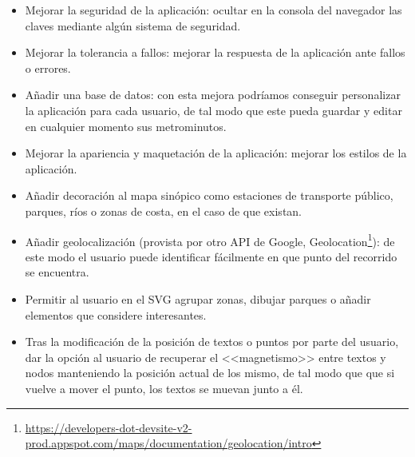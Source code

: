 \begin{itemize}
	\item Mejorar la seguridad de la aplicación: ocultar en la consola del navegador las claves mediante algún sistema de seguridad.
	\item Mejorar la tolerancia a fallos: mejorar la respuesta de la aplicación ante fallos o errores.
	\item Añadir una base de datos: con esta mejora podríamos conseguir personalizar la aplicación para cada usuario, de tal modo que este pueda guardar y editar en cualquier momento sus metrominutos.
	\item Mejorar la apariencia y maquetación de la aplicación: mejorar los estilos de la aplicación.
	\item Añadir decoración al mapa sinópico como estaciones de transporte público, parques, ríos o zonas de costa, en el caso de que existan.
	\item Añadir geolocalización (provista por otro API de Google, Geolocation\footnote{\url{https://developers-dot-devsite-v2-prod.appspot.com/maps/documentation/geolocation/intro}}): de este modo el usuario puede identificar fácilmente en que punto del recorrido se encuentra.
	\item Permitir al usuario en el SVG agrupar zonas, dibujar parques o añadir elementos que considere interesantes.
	\item Tras la modificación de la posición de textos o puntos por parte del usuario, dar la opción al usuario de recuperar el <<magnetismo>> entre textos y nodos manteniendo la posición actual de los mismo, de tal modo que que si vuelve a mover el punto, los textos se muevan junto a él.
\end{itemize}
